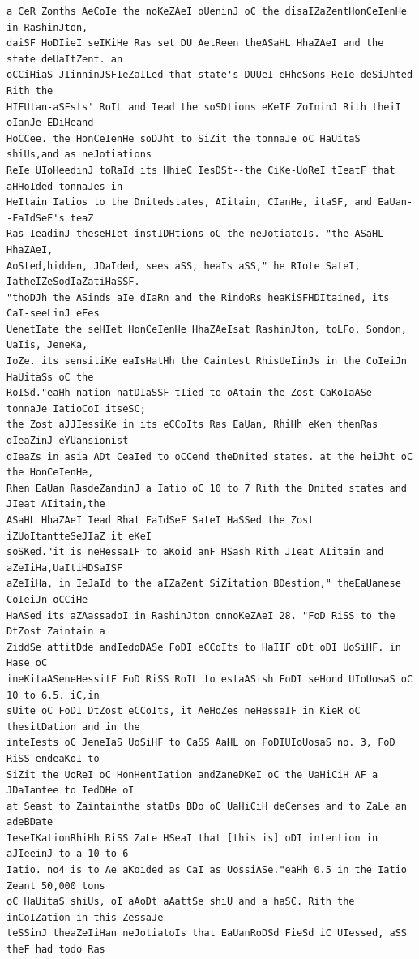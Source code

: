 \documentclass[11pt,a4paper]{article}
\begin{document}
\begin{lstlisting}[style=ciphertext,caption={Complete text after iteration 6}]
a CeR Zonths AeCoIe the noKeZAeI oUeninJ oC the disaIZaZentHonCeIenHe in RashinJton,
daiSF HoDIieI seIKiHe Ras set DU AetReen theASaHL HhaZAeI and the state deUaItZent. an
oCCiHiaS JIinninJSFIeZaILed that state's DUUeI eHheSons ReIe deSiJhted Rith the
HIFUtan-aSFsts' RoIL and Iead the soSDtions eKeIF ZoIninJ Rith theiI oIanJe EDiHeand
HoCCee. the HonCeIenHe soDJht to SiZit the tonnaJe oC HaUitaS shiUs,and as neJotiations
ReIe UIoHeedinJ toRaId its HhieC IesDSt--the CiKe-UoReI tIeatF that aHHoIded tonnaJes in
HeItain Iatios to the Dnitedstates, AIitain, CIanHe, itaSF, and EaUan--FaIdSeF's teaZ
Ras IeadinJ theseHIet instIDHtions oC the neJotiatoIs. "the ASaHL HhaZAeI,
AoSted,hidden, JDaIded, sees aSS, heaIs aSS," he RIote SateI, IatheIZeSodIaZatiHaSSF.
"thoDJh the ASinds aIe dIaRn and the RindoRs heaKiSFHDItained, its CaI-seeLinJ eFes
UenetIate the seHIet HonCeIenHe HhaZAeIsat RashinJton, toLFo, Sondon, UaIis, JeneKa,
IoZe. its sensitiKe eaIsHatHh the Caintest RhisUeIinJs in the CoIeiJn HaUitaSs oC the
RoISd."eaHh nation natDIaSSF tIied to oAtain the Zost CaKoIaASe tonnaJe IatioCoI itseSC;
the Zost aJJIessiKe in its eCCoIts Ras EaUan, RhiHh eKen thenRas dIeaZinJ eYUansionist
dIeaZs in asia ADt CeaIed to oCCend theDnited states. at the heiJht oC the HonCeIenHe,
Rhen EaUan RasdeZandinJ a Iatio oC 10 to 7 Rith the Dnited states and JIeat AIitain,the
ASaHL HhaZAeI Iead Rhat FaIdSeF SateI HaSSed the Zost iZUoItantteSeJIaZ it eKeI
soSKed."it is neHessaIF to aKoid anF HSash Rith JIeat AIitain and aZeIiHa,UaItiHDSaISF
aZeIiHa, in IeJaId to the aIZaZent SiZitation BDestion," theEaUanese CoIeiJn oCCiHe
HaASed its aZAassadoI in RashinJton onnoKeZAeI 28. "FoD RiSS to the DtZost Zaintain a
ZiddSe attitDde andIedoDASe FoDI eCCoIts to HaIIF oDt oDI UoSiHF. in Hase oC
ineKitaASeneHessitF FoD RiSS RoIL to estaASish FoDI seHond UIoUosaS oC 10 to 6.5. iC,in
sUite oC FoDI DtZost eCCoIts, it AeHoZes neHessaIF in KieR oC thesitDation and in the
inteIests oC JeneIaS UoSiHF to CaSS AaHL on FoDIUIoUosaS no. 3, FoD RiSS endeaKoI to
SiZit the UoReI oC HonHentIation andZaneDKeI oC the UaHiCiH AF a JDaIantee to IedDHe oI
at Seast to Zaintainthe statDs BDo oC UaHiCiH deCenses and to ZaLe an adeBDate
IeseIKationRhiHh RiSS ZaLe HSeaI that [this is] oDI intention in aJIeeinJ to a 10 to 6
Iatio. no4 is to Ae aKoided as CaI as UossiASe."eaHh 0.5 in the Iatio Zeant 50,000 tons
oC HaUitaS shiUs, oI aAoDt aAattSe shiU and a haSC. Rith the inCoIZation in this ZessaJe
teSSinJ theaZeIiHan neJotiatoIs that EaUanRoDSd FieSd iC UIessed, aSS theF had todo Ras

\end{lstlisting}
\end{document}
